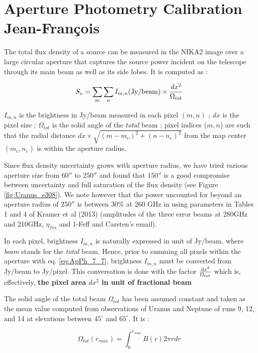 \section{Aperture Photometry Calibration {\color{green} Jean-Fran\c cois}}

The total flux density of a source can be measured in the NIKA2 image over a large circular aperture that  
captures the source power incident on the telescope  through its main
beam as well as its side lobes. It is computed as :

\begin{equation}
S_{\nu} = \sum_{m} \sum_{n}  I_{m,n} ({\rm Jy/beam}) \times {dx^2 \over {\Omega_{tot}}}
\label{eq:ApPh_7_7}
\end{equation}

\noindent  $I_{m,n}$ is the brightness in Jy/beam measured in each pixel $(m,n)$  ; $dx$ is the pixel size ;
$\Omega_{tot}$ is the solid angle of the {\it total} beam ; pixel
indices ($m,n$) are such that the radial distance $dx \times \sqrt{(m-m_c)^2 + (n-n_c)^2}$ from the map center $(m_c,n_c)$
is within the aperture radius. 

Since flux density uncertainty grows with aperture radius, we have tried various aperture size from $60''$
to $250''$ and found that $150''$  is  a good compromise between  uncertainty and full saturation of the flux density (see Figure \ref{fig:Uranus_s308}). 
We note however that the power uncounted for beyond an aperture radius of $250''$ is between 30\% at 260 GHz 
in using parameters in Tables 1 and 4 of Kramer et al
(2013) (amplitudes of the three error beams at 280GHz and 210GHz, $\eta_{fss}$ and 1-Feff and Carsten's email).

In each pixel, brightness $I_{m,n}$ is naturally expressed in unit of
Jy/beam, where  {\it beam} stands for the {\it total} beam.
Hence, prior to summing all pixels within the aperture with eq. \ref{eq:ApPh_7_7}, brightness $I_{m,n}$
must be converted from  Jy/beam to Jy/pixel. This
conversation is done with the factor $dx^2 \over {\Omega_{tot}}$
which  is, effectively, {\bf the pixel area $dx^2$  in unit of fractional beam}

The solid angle of the total beam $\Omega_{tot}$ has been assumed constant and taken as the mean value 
computed from observations of Uranus and Neptune of runs 9, 12, and 14 at elevations between $45^{\circ}$ and $65^{\circ}$. It is : 

\begin{equation}
 \Omega_{tot} (r_{max}) = \int_0^{r_{max}} B(r) 2 \pi r dr
\label{eq:Otrue}
\end{equation}

